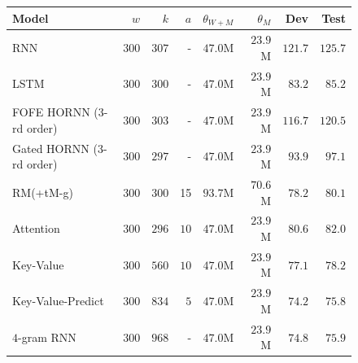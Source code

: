 \documentclass{article}
\begin{document}
\begin{figure}[t!]
{{\begin{tabular}{lrrrrrrr}
\toprule
Model             & $w$   & $k$  & $a$ & $\theta_{W+M}$ & $\theta_{M}$ &  Dev  & Test \\
\midrule
RNN             &$ 300$ & $307$ & - & $47.0$M      &$ 23.9$M     &$121.7$ & $125.7$ \\
LSTM              & $300$ & $300$ & - & $47.0$M      & $23.9$M     & $83.2$ & $85.2$ \\
\midrule
FOFE HORNN (3-rd order) \citep{soltani2016higher} & $300$ & $303$ & - & $47.0$M      & $23.9$M   & $116.7$ & $120.5$  \\ 
Gated HORNN (3-rd order) \citep{soltani2016higher} & $300$ & $297$ & - & $47.0$M      & $23.9$M  & $93.9$  & $97.1$\\
RM(+tM-g)~\citep{tran2016recurrent}  & $300$ & $300$ & 15 & $93.7$M      & $70.6$M     & $78.2$ & $80.1$      \\ 
\midrule
Attention       & $300$ & $296$& $10$ &   $47.0$M  & $23.9$M & $80.6$ &$ 82.0$\\ 
Key-Value   & $300$ & $560$ & $10$ &   $47.0$M  & $23.9$M & $77.1$ &$ 78.2$      \\ 
Key-Value-Predict   & $300$ & $834$ & $5$ &   $47.0$M  & $23.9$M & $\mathbf{74.2}$ & $\mathbf{75.8}$  \\
\midrule
$4$-gram RNN             & $300$ & $968$ & -  &  $47.0$M  & $23.9$M    & $74.8$ &$ 75.9$\\ 
\bottomrule
\end{tabular}
}
}\\
\end{figure}
\end{document}
